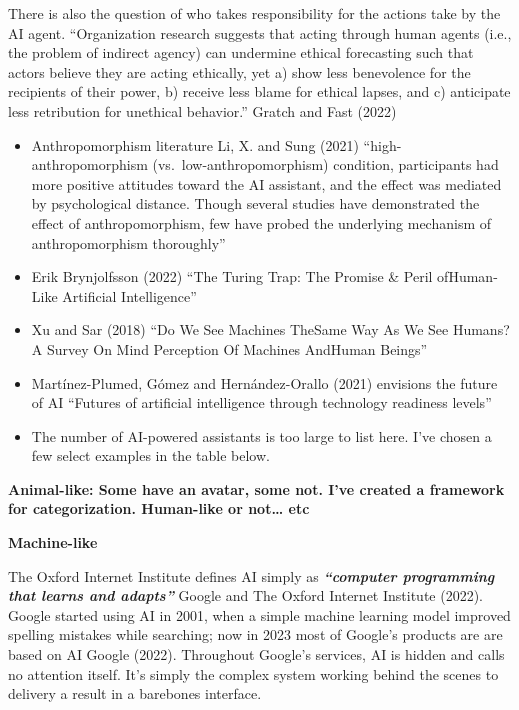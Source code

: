 \documentclass[
  letterpaper,
  DIV=11,
  numbers=noendperiod]{scrartcl}
\providecommand{\tightlist}{%
  \setlength{\itemsep}{0pt}\setlength{\parskip}{0pt}}\usepackage{longtable,booktabs,array}
\begin{document}
There is also the question of who takes responsibility for the actions
take by the AI agent. ``Organization research suggests that acting
through human agents (i.e., the problem of indirect agency) can
undermine ethical forecasting such that actors believe they are acting
ethically, yet a) show less benevolence for the recipients of their
power, b) receive less blame for ethical lapses, and c) anticipate less
retribution for unethical behavior.'' Gratch and Fast (2022)

\begin{itemize}
\tightlist
\item
  Anthropomorphism literature Li, X. and Sung (2021)
  ``high-anthropomorphism (vs.~low-anthropomorphism) condition,
  participants had more positive attitudes toward the AI assistant, and
  the effect was mediated by psychological distance. Though several
  studies have demonstrated the effect of anthropomorphism, few have
  probed the underlying mechanism of anthropomorphism thoroughly''
\item
  Erik Brynjolfsson (2022) ``The Turing Trap: The Promise \& Peril
  ofHuman-Like Artificial Intelligence''
\item
  Xu and Sar (2018) ``Do We See Machines TheSame Way As We See Humans? A
  Survey On Mind Perception Of Machines AndHuman Beings''
\item
  Martínez-Plumed, Gómez and Hernández-Orallo (2021) envisions the
  future of AI ``Futures of artificial intelligence through technology
  readiness levels''
\item
  The number of AI-powered assistants is too large to list here. I've
  chosen a few select examples in the table below.
\end{itemize}

\textbf{Animal-like: Some have an avatar, some not. I've created a
framework for categorization. Human-like or not\ldots{} etc}

\textbf{Machine-like}

The Oxford Internet Institute defines AI simply as
\textbf{\emph{``computer programming that learns and adapts''}} Google
and The Oxford Internet Institute (2022). Google started using AI in
2001, when a simple machine learning model improved spelling mistakes
while searching; now in 2023 most of Google's products are are based on
AI Google (2022). Throughout Google's services, AI is hidden and calls
no attention itself. It's simply the complex system working behind the
scenes to delivery a result in a barebones interface.
\end{document}
